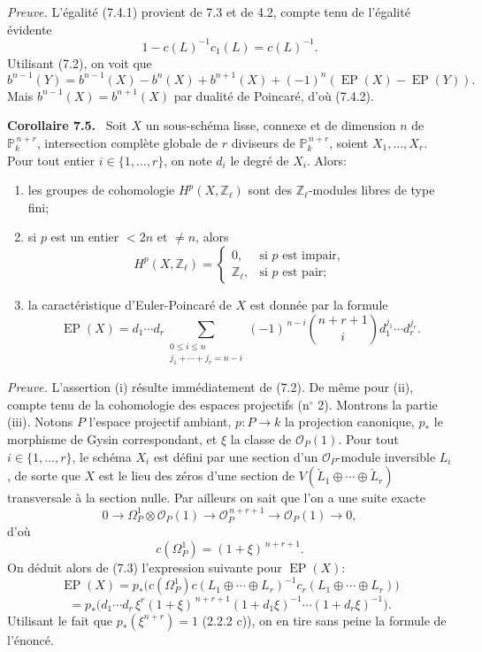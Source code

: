 \documentclass[11pt]{article}
\newenvironment{statement}[1]{\par\medskip\noindent\textbf{#1.}\ }{\par\medskip}
\begin{document}
\emph{Preuve.} L'égalité (7.4.1) provient de 7.3 et de 4.2, compte tenu de l'égalité évidente
\[
1-c(L)^{-1}c_1(L)=c(L)^{-1}.
\]
Utilisant (7.2), on voit que
\[
b^{n-1}(Y)=b^{n-1}(X)-b^n(X)+b^{n+1}(X)+(-1)^n(\operatorname{EP}(X)-\operatorname{EP}(Y)).
\]
Mais $b^{n-1}(X)=b^{n+1}(X)$ par dualité de Poincaré, d'où (7.4.2).

\begin{statement}{Corollaire 7.5}
Soit $X$ un sous-schéma lisse, connexe et de dimension $n$ de $\mathbb P_k^{\,n+r}$, intersection complète globale de $r$ diviseurs de $\mathbb P_k^{\,n+r}$, soient $X_1,\ldots,X_r$. Pour tout entier $i\in\{1,\ldots,r\}$, on note $d_i$ le degré de $X_i$. Alors:
\begin{enumerate}[label=(\roman*)]
\item les groupes de cohomologie $H^p(X,\mathbb Z_\ell)$ sont des $\mathbb Z_\ell$-modules libres de type fini;
\item si $p$ est un entier $<2n$ et $\ne n$, alors
\[
H^p(X,\mathbb Z_\ell)=
\begin{cases}
0,&\text{si }p\text{ est impair},\\
\mathbb Z_\ell,&\text{si }p\text{ est pair};
\end{cases}
\]
\item la caractéristique d'Euler-Poincaré de $X$ est donnée par la formule
\[
\operatorname{EP}(X)
=d_1\cdots d_r
\sum_{\substack{0\le i\le n\\ j_1+\cdots+j_r=n-i}}
(-1)^{\,n-i}\binom{n+r+1}{i}
d_1^{j_1}\cdots d_r^{j_r}.
\]
\end{enumerate}
\end{statement}

\emph{Preuve.} L'assertion (i) résulte immédiatement de (7.2). De même pour (ii), compte tenu de la cohomologie des espaces projectifs (n$^\circ$ 2). Montrons la partie (iii). Notons $P$ l'espace projectif ambiant, $p:P\to k$ la projection canonique, $p_*$ le morphisme de Gysin correspondant, et $\xi$ la classe de $\mathcal O_P(1)$. Pour tout $i\in\{1,\ldots,r\}$, le schéma $X_i$ est défini par une section d'un $\mathcal O_P$-module inversible $L_i$, de sorte que $X$ est le lieu des zéros d'une section de $V(\check L_1\oplus\cdots\oplus\check L_r)$ transversale à la section nulle. Par ailleurs on sait que l'on a une suite exacte
\[
0\to\Omega_P^1\otimes\mathcal O_P(1)\to\mathcal O_P^{\,n+r+1}\to\mathcal O_P(1)\to0,
\]
d'où
\[
c(\Omega_P^1)=(1+\xi)^{\,n+r+1}.
\]
On déduit alors de (7.3) l'expression suivante pour $\operatorname{EP}(X)$:
\[
\operatorname{EP}(X)
=p_*\bigl(c(\Omega_P^1)c(L_1\oplus\cdots\oplus L_r)^{-1}
c_r(L_1\oplus\cdots\oplus L_r)\bigr)
\]
\[
=p_*\bigl(d_1\cdots d_r\,\xi^r(1+\xi)^{\,n+r+1}
(1+d_1\xi)^{-1}\cdots(1+d_r\xi)^{-1}\bigr).
\]
Utilisant le fait que $p_*(\xi^{n+r})=1$ (2.2.2 c)), on en tire sans peine la formule de l'énoncé.
\end{document}
